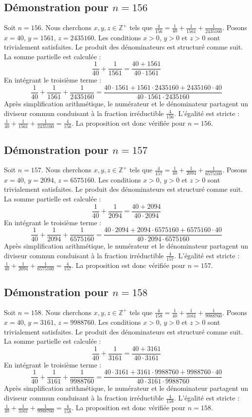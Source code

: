 \documentclass[11pt,a4paper]{article}
\begin{document}
\subsection{Démonstration pour $n = 156$}
Soit $n = 156$. Nous cherchons $x, y, z \in \mathbb{Z}^{+}$ tels que $\frac{4}{156} = \frac{1}{40} + \frac{1}{1561} + \frac{1}{2435160}$.
Posons $x = 40$, $y = 1561$, $z = 2435160$.
Les conditions $x > 0$, $y > 0$ et $z > 0$ sont trivialement satisfaites.
Le produit des dénominateurs est structuré comme suit. La somme partielle est calculée :
$$ \frac{1}{40} + \frac{1}{1561} = \frac{40+1561}{40 \cdot 1561} $$
En intégrant le troisième terme :
$$ \frac{1}{40} + \frac{1}{1561} + \frac{1}{2435160} = \frac{40 \cdot 1561 + 1561 \cdot 2435160 + 2435160 \cdot 40}{40 \cdot 1561 \cdot 2435160} $$
Après simplification arithmétique, le numérateur et le dénominateur partagent un diviseur commun conduisant à la fraction irréductible $\frac{4}{156}$.
L'égalité est stricte : $\frac{1}{40} + \frac{1}{1561} + \frac{1}{2435160} = \frac{4}{156}$.
La proposition est donc vérifiée pour $n = 156$.
\subsection{Démonstration pour $n = 157$}
Soit $n = 157$. Nous cherchons $x, y, z \in \mathbb{Z}^{+}$ tels que $\frac{4}{157} = \frac{1}{40} + \frac{1}{2094} + \frac{1}{6575160}$.
Posons $x = 40$, $y = 2094$, $z = 6575160$.
Les conditions $x > 0$, $y > 0$ et $z > 0$ sont trivialement satisfaites.
Le produit des dénominateurs est structuré comme suit. La somme partielle est calculée :
$$ \frac{1}{40} + \frac{1}{2094} = \frac{40+2094}{40 \cdot 2094} $$
En intégrant le troisième terme :
$$ \frac{1}{40} + \frac{1}{2094} + \frac{1}{6575160} = \frac{40 \cdot 2094 + 2094 \cdot 6575160 + 6575160 \cdot 40}{40 \cdot 2094 \cdot 6575160} $$
Après simplification arithmétique, le numérateur et le dénominateur partagent un diviseur commun conduisant à la fraction irréductible $\frac{4}{157}$.
L'égalité est stricte : $\frac{1}{40} + \frac{1}{2094} + \frac{1}{6575160} = \frac{4}{157}$.
La proposition est donc vérifiée pour $n = 157$.
\subsection{Démonstration pour $n = 158$}
Soit $n = 158$. Nous cherchons $x, y, z \in \mathbb{Z}^{+}$ tels que $\frac{4}{158} = \frac{1}{40} + \frac{1}{3161} + \frac{1}{9988760}$.
Posons $x = 40$, $y = 3161$, $z = 9988760$.
Les conditions $x > 0$, $y > 0$ et $z > 0$ sont trivialement satisfaites.
Le produit des dénominateurs est structuré comme suit. La somme partielle est calculée :
$$ \frac{1}{40} + \frac{1}{3161} = \frac{40+3161}{40 \cdot 3161} $$
En intégrant le troisième terme :
$$ \frac{1}{40} + \frac{1}{3161} + \frac{1}{9988760} = \frac{40 \cdot 3161 + 3161 \cdot 9988760 + 9988760 \cdot 40}{40 \cdot 3161 \cdot 9988760} $$
Après simplification arithmétique, le numérateur et le dénominateur partagent un diviseur commun conduisant à la fraction irréductible $\frac{4}{158}$.
L'égalité est stricte : $\frac{1}{40} + \frac{1}{3161} + \frac{1}{9988760} = \frac{4}{158}$.
La proposition est donc vérifiée pour $n = 158$.
\end{document}
